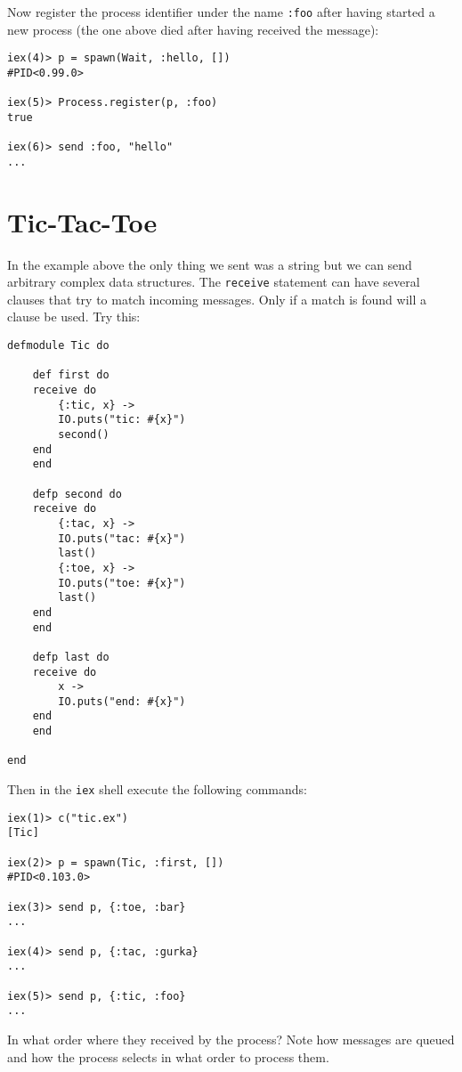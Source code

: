 \documentclass[a4paper,11pt]{article}
\begin{document}
Now register the process identifier under the name {\tt :foo} after having started a new process (the one above died after having received the message):

\begin{verbatim}
iex(4)> p = spawn(Wait, :hello, [])
#PID<0.99.0>

iex(5)> Process.register(p, :foo)
true

iex(6)> send :foo, "hello"
...
\end{verbatim}



\section{Tic-Tac-Toe}

In the example above the only thing we sent was a string but
we can send arbitrary complex data structures. The {\tt receive}
statement can have several clauses that try to match incoming
messages. Only if a match is found will a clause be used. Try this:

\begin{verbatim}
defmodule Tic do

    def first do
    receive do
        {:tic, x} ->
        IO.puts("tic: #{x}")
        second()
    end
    end
    
    defp second do
    receive do
        {:tac, x} ->
        IO.puts("tac: #{x}")
        last()
        {:toe, x} ->
        IO.puts("toe: #{x}")
        last()
    end
    end

    defp last do
    receive do
        x ->
        IO.puts("end: #{x}")
    end
    end

end
\end{verbatim}

Then in the {\tt iex} shell execute the following commands:

\begin{verbatim}
iex(1)> c("tic.ex")
[Tic]

iex(2)> p = spawn(Tic, :first, [])
#PID<0.103.0>

iex(3)> send p, {:toe, :bar}
...

iex(4)> send p, {:tac, :gurka}
...

iex(5)> send p, {:tic, :foo}
...
\end{verbatim}

In what order where they received by the process? Note how messages
are queued and how the process selects in what order to process them.
\end{document}
